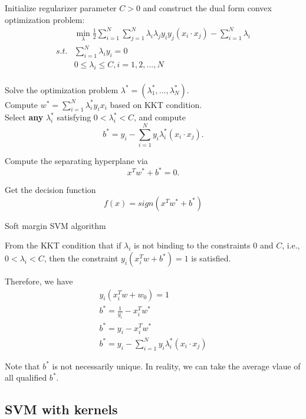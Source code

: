 \begin{refsection}
\begin{algorithm}[H]
	\SetAlgoLined
	Initialize regularizer parameter $C>0$ and construct the dual form convex optimization problem:
	\begin{align*}
	& \min_{\lambda} \frac{1}{2}\sum_{i=1}^N\sum_{j=1}^N \lambda_i\lambda_j y_iy_j(x_i\cdot x_j) - \sum_{i=1}^N \lambda_i \\
	s.t. &  \sum_{i=1}^N \lambda_i y_i = 0\\
	& 0 \leq \lambda_i \leq C, i=1,2,...,N
	\end{align*}\\
	Solve the optimization problem $\lambda^*=(\lambda_1^*,...,\lambda_N^*)$.\\
	Compute $w^* = \sum_{i=1}^N \lambda_i^* y_ix_i$ based on KKT condition.\\
	Select \textbf{any} $\lambda_i^*$ satisfying $0<\lambda_i^*<C$, and compute
	$$b^* = y_i - \sum_{i=1}^N y_i \lambda_i^* (x_i\cdot x_j).$$
	
	Compute the separating hyperplane via
	$$x^Tw^* + b^* = 0.$$
	
	Get the decision function
	$$f(x) = sign(x^Tw^* + b^*)$$
	
	\caption{Soft margin SVM algorithm}
\end{algorithm}


\begin{remark}
	From the KKT condition that if $\lambda_i$ is not binding to the constraints $0$ and $C$, i.e., $0<\lambda_i<C$, then the constraint $	y_i(x_i^Tw + b^*) = 1$ is satisfied.
	
	Therefore, we have
	\begin{align*}
	y_i(x_i^Tw + w_0) = 1 \\
	b^* = \frac{1}{y_i} - x_i^Tw^* \\
	b^* = y_i - x_i^Tw^* \\
	b^* = y_i - \sum_{i=1}^N y_i \lambda_i^* (x_i\cdot x_j) 
	\end{align*}
	
	Note that $b^*$ is not necessarily unique.	In reality, we can take the average vlaue of all qualified $b^*$.
\end{remark}


\subsection{SVM with kernels}

\end{refsection}
